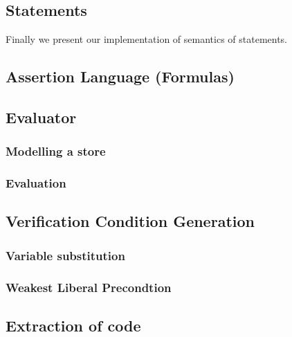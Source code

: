 \subsection{Statements}
Finally we present our implementation of semantics of statements.



\subsection{Assertion Language (Formulas)}\label{sec:iformulas}


\subsection{Evaluator}\label{sec:evaluator}


\subsubsection{Modelling a store}


\subsubsection{Evaluation}


\subsection{Verification Condition Generation}\label{sec:vcg}


\subsubsection{Variable substitution}


\subsubsection{Weakest Liberal Precondtion}


\subsection{Extraction of code}

